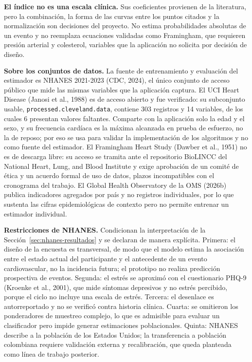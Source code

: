 \documentclass[12pt,letterpaper]{article}
\begin{document}
\textbf{El índice no es una escala clínica.} Sus coeficientes provienen de la
literatura, pero la combinación, la forma de las curvas entre los puntos citados
y la normalización son decisiones del proyecto. No estima probabilidades
absolutas de un evento y no reemplaza ecuaciones validadas como Framingham, que
requieren presión arterial y colesterol, variables que la aplicación no solicita
por decisión de diseño.

\textbf{Sobre los conjuntos de datos.} La fuente de entrenamiento y evaluación
del estimador es NHANES 2021-2023 (CDC, 2024), el único conjunto de acceso
público que mide las mismas variables que la aplicación captura. El UCI Heart
Disease (Janosi et al., 1988) es de acceso abierto y fue verificado: su
subconjunto usable, \texttt{processed.cleveland.data}, contiene 303 registros y
14 variables, de los cuales 6 presentan valores faltantes. Comparte con la
aplicación solo la edad y el sexo, y su frecuencia cardíaca es la máxima
alcanzada en prueba de esfuerzo, no la de reposo; por eso se usa para validar la
implementación de los algoritmos y no como fuente del estimador. El Framingham
Heart Study (Dawber et al., 1951) no es de descarga libre: su acceso se tramita
ante el repositorio BioLINCC del National Heart, Lung, and Blood Institute y
exige aprobación de un comité de ética y un acuerdo formal de uso de datos,
plazos incompatibles con el cronograma del trabajo. El Global Health Observatory
de la OMS (2026b) publica indicadores agregados por país y no registros
individuales, por lo que sustenta las cifras epidemiológicas de contexto pero no
permite entrenar un estimador individual.

\textbf{Restricciones de NHANES.} Condicionan la interpretación de la
Sección~\ref{sec:nhanes-resultados} y se declaran de manera explícita. Primera:
el diseño de la encuesta es transversal, de modo que el modelo estima la
asociación entre el estado actual del participante y el antecedente de un evento
cardiovascular, no la incidencia futura; el prototipo no realiza predicción
prospectiva de eventos. Segunda: el estrés se aproximó con el cuestionario PHQ-9
(Kroenke et al., 2001), que mide síntomas depresivos y no estrés percibido,
porque el ciclo no incluye una escala de estrés. Tercera: el desenlace es
autorreportado y no se verificó contra historia clínica. Cuarta: se omitieron
los ponderadores de muestreo complejo, lo que es admisible para evaluar un
clasificador pero impide generar estimaciones poblacionales. Quinta: NHANES
describe a la población de los Estados Unidos; la transferencia a población
colombiana requiere validación externa y recalibración, que queda planteada como
línea de trabajo posterior.
\end{document}
